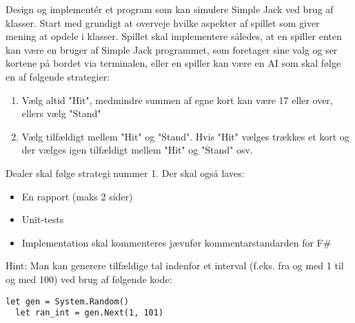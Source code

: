 Design og implement\'{e}r et program som kan simulere Simple Jack ved
brug af klasser.  Start med grundigt at overveje hvilke aspekter af
spillet som giver mening at opdele i klasser. Spillet skal
implementere således, at en spiller enten kan være en bruger af Simple
Jack programmet, som foretager sine valg og ser kortene på bordet via terminalen, eller en spiller kan være en AI som skal følge en af følgende strategier:
\begin{enumerate}
\item Vælg altid "Hit", medmindre summen af egne kort kan være 17 eller over, ellers vælg "Stand"
\item Vælg tilfældigt mellem "Hit" og "Stand". Hvis "Hit" vælges trækkes et kort og der vælges igen tilfældigt mellem "Hit" og "Stand" osv.
\end{enumerate}
Dealer skal følge strategi nummer 1.  Der skal også laves:
\begin{itemize}
\item En rapport (maks 2 sider)
\item Unit-tests
\item Implementation skal kommenteres jævnfør kommentarstandarden for F\#
\end{itemize}
Hint: Man kan generere tilfældige tal indenfor et interval (f.eks. fra og med 1 til og med 100) ved brug af følgende kode:
\begin{lstlisting}[frame=none]
  let gen = System.Random()
  let ran_int = gen.Next(1, 101)
\end{lstlisting}
